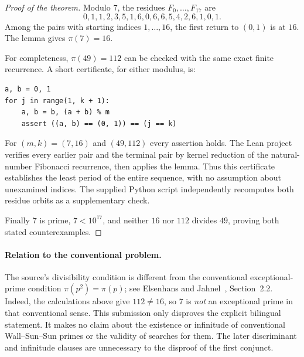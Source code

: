 \documentclass[11pt]{article}
\begin{document}
\begin{proof}[Proof of the theorem]
Modulo $7$, the residues $F_0,\ldots,F_{17}$ are
\[
0,1,1,2,3,5,1,6,0,6,6,5,4,2,6,1,0,1.
\]
Among the pairs with starting indices $1,\ldots,16$, the first return
to $(0,1)$ is at $16$. The lemma gives $\pi(7)=16$.

For completeness, $\pi(49)=112$ can be checked with the same exact
finite recurrence. A short certificate, for either modulus, is:
\begin{verbatim}
a, b = 0, 1
for j in range(1, k + 1):
    a, b = b, (a + b) % m
    assert ((a, b) == (0, 1)) == (j == k)
\end{verbatim}
For $(m,k)=(7,16)$ and $(49,112)$ every assertion holds.
The Lean project verifies every earlier pair and the terminal pair
by kernel reduction of the natural-number Fibonacci recurrence,
then applies the lemma. Thus this certificate establishes the
least period of the entire sequence, with no assumption about
unexamined indices. The supplied Python script independently
recomputes both residue orbits as a supplementary check.

Finally $7$ is prime, $7<10^{17}$, and neither $16$ nor $112$ divides
$49$, proving both stated counterexamples.
\end{proof}

\paragraph{Relation to the conventional problem.}
The source's divisibility condition is different from the
conventional exceptional-prime condition $\pi(p^2)=\pi(p)$;
see Elsenhans and Jahnel~\cite{EJ}, Section~2.2.
Indeed, the calculations above give $112\ne16$, so $7$ is
\emph{not} an exceptional prime in that conventional sense.
This submission only disproves the explicit bilingual statement.
It makes no claim about the existence or infinitude of conventional
Wall--Sun--Sun primes or the validity of searches for them.
The later discriminant and infinitude clauses are unnecessary to
the disproof of the first conjunct.
\end{document}

